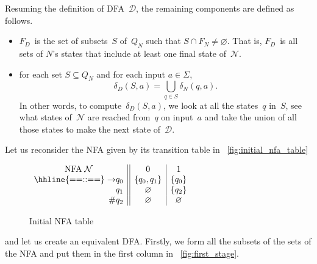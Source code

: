 Resuming the definition of DFA~\(\mathcal{D}\), the remaining
components are defined as follows.
\begin{itemize}

  \item \(F_D\)~is the set of subsets~\(S\) of~\(Q_N\) such that \(S
    \cap F_N \neq \varnothing\). That is, \(F_D\)~is all sets of
    \(N\)'s states that include at least one final state
    of~\(\mathcal{N}\).

  \item for each set \(S \subseteq Q_N\) and for each input \(a \in
    \Sigma\),
  \begin{equation*}
    \delta_D(S, a) = \bigcup_{q \in S}{\delta_N (q, a)}.
  \end{equation*}
  In other words, to compute~\(\delta_D (S, a)\), we look at all the
  states~\(q\) in~\(S\), see what states of~\(\mathcal{N}\) are
  reached from~\(q\) on input~\(a\) and take the union of all those
  states to make the next state of~\(\mathcal{D}\).

\end{itemize}
Let us reconsider the NFA given by its transition table in
\fig~\vref{fig:initial_nfa_table}
\begin{figure}
\centering
\(\begin{array}{r@{}l||c|c}
    \multicolumn{2}{c||}{\text{NFA} \; \mathcal{N}} & 0 & 1\\
    \hhline{==::==}
    \rightarrow & q_0 & \{q_0, q_1\} & \{q_0\}\\
                & q_1 & \varnothing  & \{q_2\}\\
    \#          & q_2 & \varnothing  & \varnothing
\end{array}\)
\caption{Initial NFA table\label{fig:initial_nfa_table}}
\end{figure}
and let us create an equivalent DFA. Firstly, we form all the subsets
of the sets of the NFA and put them in the first column in
\fig~\vref{fig:first_stage}.
